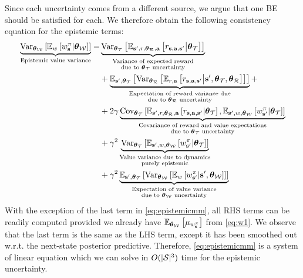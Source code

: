 \documentclass{article}
\begin{document}
\begin{appendices}
Since each uncertainty comes from a different source, we argue that one BE should be satisfied for each. We therefore obtain the following consistency equation for the epistemic terms:
\begin{align}\label{eq:epistemicmm}
\underbrace{\Var_{\thetamcw} \sqb{\E_w\sqb{\wb | \thetamcw}}}_{\text{Epistemic value variance}} =& \underbrace{\Var_{\thetamct} \sqb{ \E_{\ns, r, \thetamcr, \ac} \sqb{\rsanb \big| \thetamct}}}_{\substack{\text{Variance of expected reward} \\ \text{due to $\thetamct$ uncertainty}}} \\  & + \underbrace{\E_{\ns, \thetamct}\sqb{ \Var_{\thetamcr} \sqb{ \E_{r, \ac} \sqb{\rsanb \big| \ns, \thetamct, \thetamcr}}}}_{\substack{\text{Expectation of reward variance due} \\ \text{due to $\thetamcr$ uncertainty}}} + \nonumber\\
& + 2 \gamma \underbrace{\Cov_{\thetamct}\sqb{\E_{\ns, r, \thetamcr, \ac}\sqb{\rsanb | \thetamct}, \E_{\ns, w, \thetamcw}\sqb{\wnb | \thetamct}}}_{\substack{\text{Covariance of reward and value expectations} \\ \text{due to $\thetamct$ uncertainty}}} \nonumber \\
& + \gamma^2 \underbrace{\Var_{\thetamct} \sqb{\E_{\ns, w, \thetamcw} \sqb{\wnb | \thetamct}}}_{\substack{\text{Value variance due to dynamics} \\ \text{purely epistemic}}}\nonumber \\
& + \gamma^2 \underbrace{\E_{\ns, \thetamct}\sqb{\Var_{\thetamcw} \sqb{ \E_w \sqb{\wnb | \ns, \thetamcw}}}}_{\substack{\text{Expectation of value variance} \\ \text{due to $\thetamcw$ uncertainty}}} \nonumber
\end{align}
With the exception of the last term in \cref{eq:epistemicmm}, all RHS terms can be readily computed provided we already have $\E_{\thetamcw} \sqb{\mu_{\wb}}$ from \cref{eq:w1}. We observe that the last term is the same as the LHS term, except it has been smoothed out w.r.t. the next-state posterior predictive. Therefore, \cref{eq:epistemicmm} is a system of linear equation which we can solve in $O(|\mcs|^3)$ time for the epistemic uncertainty.


\end{appendices}
\end{document}
